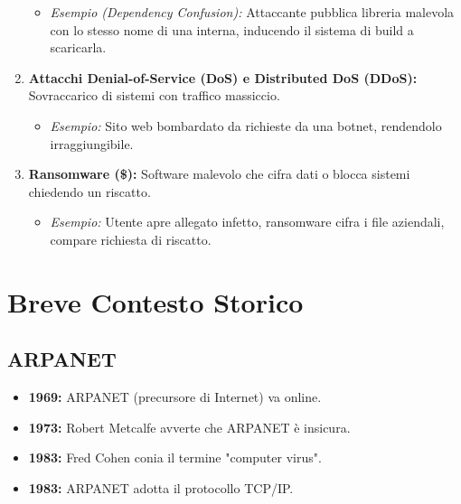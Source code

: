 \begin{enumerate}
        \begin{itemize}
            \item \textit{Esempio (Dependency Confusion):} Attaccante pubblica libreria malevola con lo stesso nome di una interna, inducendo il sistema di build a scaricarla.
        \end{itemize}
    \item \textbf{Attacchi Denial-of-Service (DoS) e Distributed DoS (DDoS):} Sovraccarico di sistemi con traffico massiccio.
        \begin{itemize}
            \item \textit{Esempio:} Sito web bombardato da richieste da una botnet, rendendolo irraggiungibile.
        \end{itemize}
    \item \textbf{Ransomware (\$):} Software malevolo che cifra dati o blocca sistemi chiedendo un riscatto.
        \begin{itemize}
            \item \textit{Esempio:} Utente apre allegato infetto, ransomware cifra i file aziendali, compare richiesta di riscatto.
        \end{itemize}
\end{enumerate}

\section{Breve Contesto Storico}

\subsection{ARPANET}
\begin{itemize}
    \item \textbf{1969:} ARPANET (precursore di Internet) va online.
    \item \textbf{1973:} Robert Metcalfe avverte che ARPANET è insicura.
    \item \textbf{1983:} Fred Cohen conia il termine "computer virus".
    \item \textbf{1983:} ARPANET adotta il protocollo TCP/IP.
\end{itemize}

